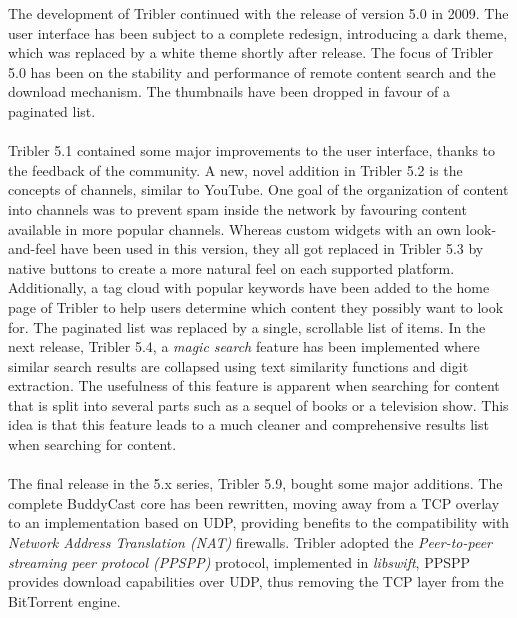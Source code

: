 \noindent The development of Tribler continued with the release of version 5.0 in 2009\cite{historyoftribler}. The user interface has been subject to a complete redesign, introducing a dark theme, which was replaced by a white theme shortly after release. The focus of Tribler 5.0 has been on the stability and performance of remote content search and the download mechanism. The thumbnails have been dropped in favour of a paginated list.\\\\
Tribler 5.1 contained some major improvements to the user interface, thanks to the feedback of the community. A new, novel addition in Tribler 5.2 is the concepts of channels, similar to YouTube. One goal of the organization of content into channels was to prevent spam inside the network by favouring content available in more popular channels. Whereas custom widgets with an own look-and-feel have been used in this version, they all got replaced in Tribler 5.3 by native buttons to create a more natural feel on each supported platform. Additionally, a tag cloud with popular keywords have been added to the home page of Tribler to help users determine which content they possibly want to look for. The paginated list was replaced by a single, scrollable list of items. In the next release, Tribler 5.4, a \emph{magic search} feature has been implemented where similar search results are collapsed using text similarity functions and digit extraction. The usefulness of this feature is apparent when searching for content that is split into several parts such as a sequel of books or a television show. This idea is that this feature leads to a much cleaner and comprehensive results list when searching for content.\\\\
The final release in the 5.x series, Tribler 5.9, bought some major additions. The complete BuddyCast core has been rewritten, moving away from a TCP overlay to an implementation based on UDP, providing benefits to the compatibility with \emph{Network Address Translation (NAT)} firewalls. Tribler adopted the \emph{Peer-to-peer streaming peer protocol (PPSPP)} protocol\cite{bakker2015peer}, implemented in \emph{libswift}\cite{libswiftgithub}, PPSPP provides download capabilities over UDP, thus removing the TCP layer from the BitTorrent engine.\\\\
